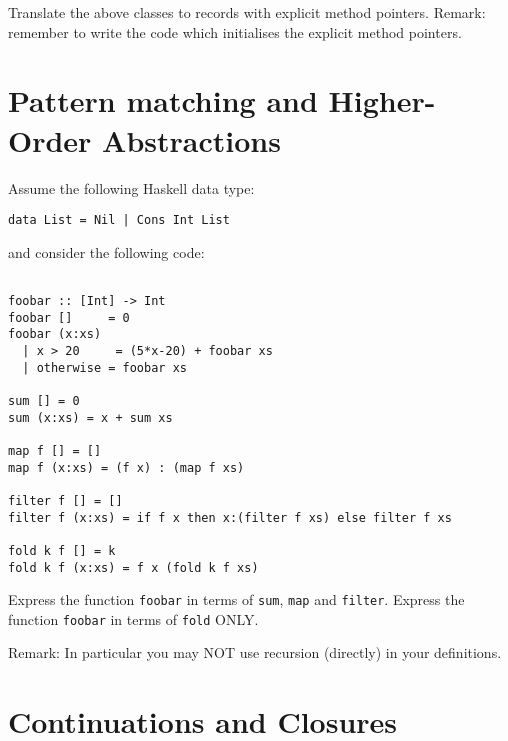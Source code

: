 \documentclass{article}
\newcommand{\answer}[1]{}
\begin{document}
Translate the above classes to records with explicit method pointers.
Remark: remember to write the code which initialises the explicit
method pointers.

\answer{
\begin{verbatim}
    struct A {
      float x = 0
      float y = 0
    }
    struct B {
      int n = 0
      void* f(B* this, A* p) = <BODY1>;
    }
    struct C {
      int n = 0
      void* f(C* this, A* p) = <BODY2>;
      int m;
    }
\end{verbatim}
}

\newpage
\section{Pattern matching and Higher-Order Abstractions}

Assume the following Haskell data type:
\begin{verbatim}
data List = Nil | Cons Int List
\end{verbatim}
and consider the following code:
\begin{verbatim}

foobar :: [Int] -> Int
foobar []     = 0
foobar (x:xs)
  | x > 20     = (5*x-20) + foobar xs
  | otherwise = foobar xs

sum [] = 0
sum (x:xs) = x + sum xs

map f [] = []
map f (x:xs) = (f x) : (map f xs)

filter f [] = []
filter f (x:xs) = if f x then x:(filter f xs) else filter f xs

fold k f [] = k
fold k f (x:xs) = f x (fold k f xs)
\end{verbatim}

Express the function \texttt{foobar} in terms of \texttt{sum}, \texttt{map} and \texttt{filter}.
Express the function \texttt{foobar} in terms of \texttt{fold} ONLY.

Remark: In particular you may NOT use recursion (directly) in your definitions.

\answer{
  \begin{verbatim}
  foobar = sum . map (\x -> 7*x+2) . filter (>3)
  foobar = fold 0 f where
     f x acc = if x > 3 then 7*x + 2 + acc else acc
   \end{verbatim}
}
\newpage
\section{Continuations and Closures}
\end{document}
